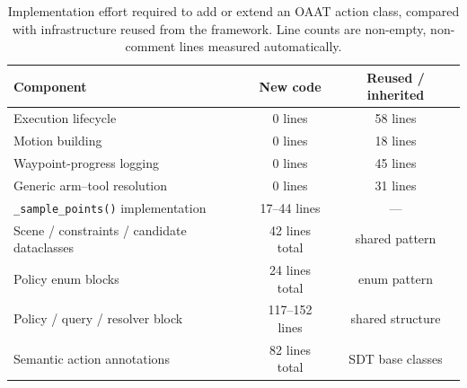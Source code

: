 \begin{table}[h]
\centering
\caption{Implementation effort required to add or extend an \ac{OAAT}
         action class, compared with infrastructure reused from the framework.
         Line counts are non-empty, non-comment lines measured automatically.}
\label{tab:oaat-extension-cost-generated}
\begin{tabular}{lcc}
\toprule
Component & New code & Reused / inherited \\
\midrule
Execution lifecycle & 0 lines & 58 lines \\
Motion building & 0 lines & 18 lines \\
Waypoint-progress logging & 0 lines & 45 lines \\
Generic arm--tool resolution & 0 lines & 31 lines \\
\texttt{\_sample\_points()} implementation & 17--44 lines & --- \\
Scene / constraints / candidate dataclasses & 42 lines total & shared pattern \\
Policy enum blocks & 24 lines total & enum pattern \\
Policy / query / resolver block & 117--152 lines & shared structure \\
Semantic action annotations & 82 lines total & \ac{SDT} base classes \\
\bottomrule
\end{tabular}
\end{table}
